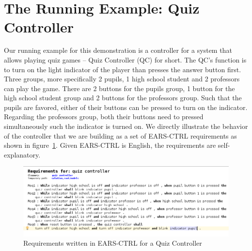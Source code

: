 \vspace{-.5cm}
\section{The Running Example: Quiz Controller}
\label{sec:example}
\vspace{-.2cm}
Our running example for this demonstration is a controller for a system that
allows playing quiz games -- Quiz Controller (QC) for short. The QC's function
is to turn on the light indicator of the player than presses the answer button
first. Three groups, more specifically 2 pupils, 1 high school student and 2
professors can play the game. There are 2 buttons for the pupils group, 1 button
for the high school student group and 2 buttons for the professors group. Such
that the pupils are favored, either of their buttons can be pressed to turn on
the indicator. Regarding the professors group, both their buttons need to
pressed simultaneously such the indicator is turned on. We directly illustrate
the behavior of the controller that we are building as a set of
\textsf{EARS-CTRL} requirements as shown in figure~\ref{fig:QC_reqs}.
Given \textsf{EARS-CTRL} is English, the requirements are self-explanatory.
\begin{figure}[!h]
\centering
\includegraphics[width=1\textwidth]{./images/QC_Reqs.png}
\vspace{-1cm}
\caption{Requirements written in \textsf{EARS-CTRL} for a Quiz Controller}
\label{fig:QC_reqs}
\end{figure}